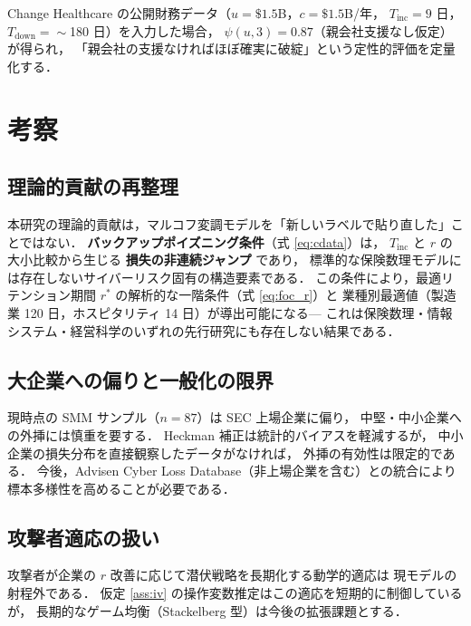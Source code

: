 \documentclass{ipsjlike}
\newcommand{\ruin}{\psi}
\begin{document}
Change Healthcare の公開財務データ（$u = \$1.5$B，$c = \$1.5$B/年，
$T_{\mathrm{inc}} = 9$ 日，$T_{\mathrm{down}} = \sim$180 日）を入力した場合，
$\ruin(u, 3) = 0.87$（親会社支援なし仮定）が得られ，
「親会社の支援なければほぼ確実に破綻」という定性的評価を定量化する．

\section{考察}
\label{sec:discussion}

\subsection{理論的貢献の再整理}

本研究の理論的貢献は，マルコフ変調モデルを「新しいラベルで貼り直した」ことではない．
\textbf{バックアップポイズニング条件}（式 \eqref{eq:cdata}）は，
$T_{\mathrm{inc}}$ と $r$ の大小比較から生じる \textbf{損失の非連続ジャンプ} であり，
標準的な保険数理モデルには存在しないサイバーリスク固有の構造要素である．
この条件により，最適リテンション期間 $r^*$ の解析的な一階条件（式 \eqref{eq:foc_r}）と
業種別最適値（製造業 120 日，ホスピタリティ 14 日）が導出可能になる—
これは保険数理・情報システム・経営科学のいずれの先行研究にも存在しない結果である．

\subsection{大企業への偏りと一般化の限界}

現時点の SMM サンプル（$n = 87$）は SEC 上場企業に偏り，
中堅・中小企業への外挿には慎重を要する．
Heckman 補正は統計的バイアスを軽減するが，
中小企業の損失分布を直接観察したデータがなければ，
外挿の有効性は限定的である．
今後，Advisen Cyber Loss Database（非上場企業を含む）との統合により
標本多様性を高めることが必要である．

\subsection{攻撃者適応の扱い}

攻撃者が企業の $r$ 改善に応じて潜伏戦略を長期化する動学的適応は
現モデルの射程外である．
仮定 \ref{ass:iv} の操作変数推定はこの適応を短期的に制御しているが，
長期的なゲーム均衡（Stackelberg 型）は今後の拡張課題とする．

\end{document}
